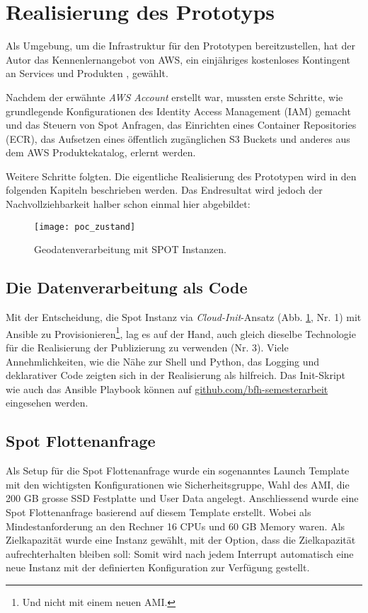 \section{Realisierung des Prototyps}
Als Umgebung, um die Infrastruktur für den Prototypen bereitzustellen, hat der Autor das Kennenlernangebot von AWS, ein einjähriges kostenloses Kontingent an Services und Produkten \cite{FreeTier2020}, gewählt.

Nachdem der erwähnte \emph{AWS Account} erstellt war, mussten erste Schritte, wie grundlegende Konfigurationen des Identity Access Management (IAM) gemacht und das Steuern von Spot Anfragen, das Einrichten eines Container Repositories (ECR), das Aufsetzen eines öffentlich zugänglichen S3 Buckets und anderes aus dem AWS Produktekatalog, erlernt werden.

Weitere Schritte folgten. Die eigentliche Realisierung des Prototypen wird in den folgenden Kapiteln beschrieben werden. Das Endresultat wird jedoch der Nachvollziehbarkeit halber schon einmal hier abgebildet:

\begin{figure}[H]
	\centering
	\texttt{[image: poc\_zustand]}
	\caption{Geodatenverarbeitung mit SPOT Instanzen.}
	\label{fig:ist_zustand}
\end{figure}

\subsection{Die Datenverarbeitung als Code}
Mit der Entscheidung, die Spot Instanz via \emph{Cloud-Init}-Ansatz (Abb. \ref{fig:ist_zustand}, Nr. 1) mit Ansible zu Provisionieren\footnote{Und nicht mit einem neuen AMI.}, lag es auf der Hand, auch gleich dieselbe Technologie für die Realisierung der Publizierung zu verwenden (Nr. 3). 
Viele Annehmlichkeiten, wie die Nähe zur Shell und Python, das Logging und deklarativer Code zeigten sich in der Realisierung als hilfreich. Das Init-Skript wie auch das Ansible Playbook können auf \href{https://github.com/bfh-semesterarbeit/up-and-running-dataprocessing}{github.com/bfh-semesterarbeit} eingesehen werden.


\subsection{Spot Flottenanfrage}
Als Setup für die Spot Flottenanfrage wurde ein sogenanntes Launch Template mit den wichtigsten Konfigurationen wie Sicherheitsgruppe, Wahl des AMI, die 200 GB grosse SSD Festplatte und User Data angelegt. Anschliessend wurde eine Spot Flottenanfrage basierend auf diesem Template erstellt. Wobei als Mindestanforderung an den Rechner 16 CPUs und 60 GB Memory waren. Als Zielkapazität wurde eine Instanz gewählt, mit der Option, dass die Zielkapazität aufrechterhalten bleiben soll: Somit wird nach jedem Interrupt automatisch eine neue Instanz mit der definierten Konfiguration zur Verfügung gestellt.

